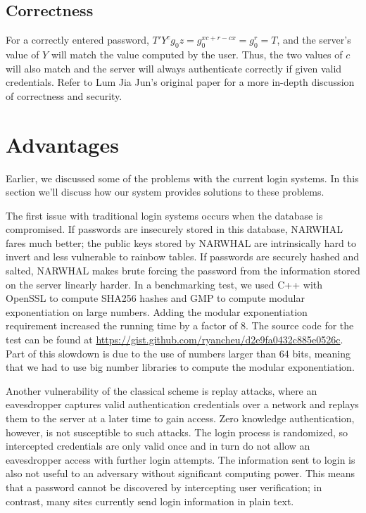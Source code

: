 \documentclass[11pt]{article}
\begin{document}
\subsection{Correctness}

For a correctly entered password, $T' Y^cg_0z = g_0^{xc + r - cx} = g_0^r = T$, and the server's value of $Y$ will match the value computed by the user.  Thus, the two values of $c$ will also match and the server will always authenticate correctly if given valid credentials.  Refer to Lum Jia Jun's original paper for a more in-depth discussion of correctness and security.


\section{Advantages}

Earlier, we discussed some of the problems with the current login systems.  In this section we'll discuss how our system provides solutions to these problems.

The first issue with traditional login systems occurs when the database is compromised. If passwords are insecurely stored in this database, NARWHAL fares much better; the public keys stored by NARWHAL are intrinsically hard to invert and less vulnerable to rainbow tables. If passwords are securely hashed and salted, NARWHAL makes brute forcing the password from the information stored on the server linearly harder. In a benchmarking test, we used C++ with OpenSSL to compute SHA256 hashes and GMP to compute modular exponentiation on large numbers.  Adding the modular exponentiation requirement increased the running time by a factor of 8. The source code for the test can be found at \url{https://gist.github.com/ryancheu/d2e9fa0432c885e0526c}.  Part of this slowdown is due to the use of numbers larger than 64 bits, meaning that we had to use big number libraries to compute the modular exponentiation.

Another vulnerability of the classical scheme is replay attacks, where an eavesdropper captures valid authentication credentials over a network and replays them to the server at a later time to gain access. Zero knowledge authentication, however, is not susceptible to such attacks.  The login process is randomized, so intercepted credentials are only valid once and in turn do not allow an eavesdropper access with further login attempts.  The information sent to login is also not useful to an adversary without significant computing power.  This means that a password cannot be discovered by intercepting user verification; in contrast, many sites currently send login information in plain text.
\end{document}
